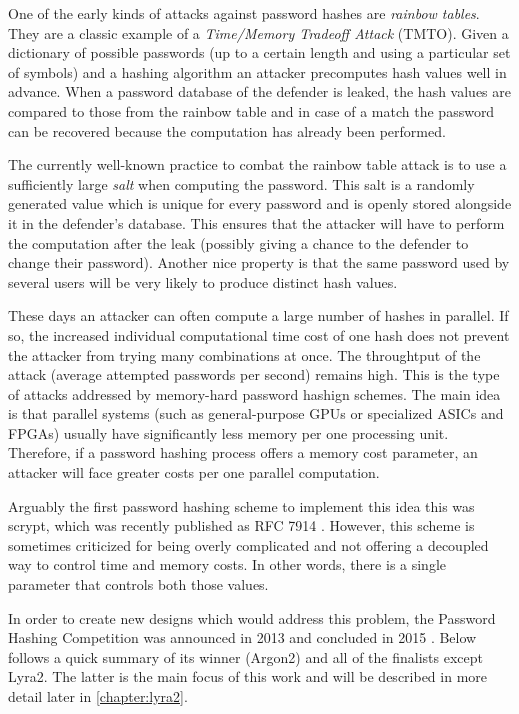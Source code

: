 One of the early kinds of attacks against password hashes are \emph{rainbow tables}. They are a classic example of a \emph{Time/Memory Tradeoff Attack} (TMTO). Given a dictionary of possible passwords (up to a certain length and using a particular set of symbols) and a hashing algorithm an attacker precomputes hash values well in advance. When a password database of the defender is leaked, the hash values are compared to those from the rainbow table and in case of a match the password can be recovered because the computation has already been performed.

The currently well-known practice to combat the rainbow table attack is to use a sufficiently large \emph{salt} when computing the password. This salt is a randomly generated value which is unique for every password and is openly stored alongside it in the defender's database. This ensures that the attacker will have to perform the computation after the leak (possibly giving a chance to the defender to change their password). Another nice property is that the same password used by several users will be very likely to produce distinct hash values.

These days an attacker can often compute a large number of hashes in parallel. If so, the increased individual computational time cost of one hash does not prevent the attacker from trying many combinations at once. The throughtput of the attack (average attempted passwords per second) remains high. This is the type of attacks addressed by memory-hard password hashign schemes. The main idea is that parallel systems (such as general-purpose GPUs or specialized ASICs and FPGAs) usually have significantly less memory per one processing unit. Therefore, if a password hashing process offers a memory cost parameter, an attacker will face greater costs per one parallel computation.

Arguably the first password hashing scheme to implement this idea this was scrypt, which was recently published as RFC 7914 \cite{percival:2016:scrypt}. However, this scheme is sometimes criticized for being overly complicated and not offering a decoupled way to control time and memory costs. In other words, there is a single parameter that controls both those values.

In order to create new designs which would address this problem, the Password Hashing Competition was announced in 2013 and concluded in 2015 \cite{wetzels:2016:phc}. Below follows a quick summary of its winner (Argon2) and all of the finalists except Lyra2. The latter is the main focus of this work and will be described in more detail later in \ref{chapter:lyra2}.

